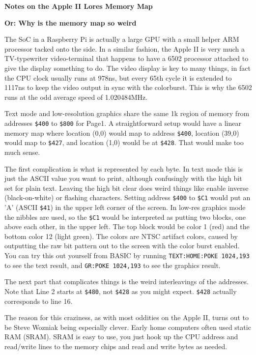 \documentclass{article}
\begin{document}
\begin{center}
\begin{large}
{\bf Notes on the Apple II Lores Memory Map}
\end{large}

{\bf Or: Why is the memory map so weird}
\end{center}
The SoC in a Raspberry Pi is actually a large GPU with a small
helper ARM processor tacked onto the side.
In a similar fashion, the Apple II is very much
a TV-typewriter video-terminal that happens to have a 6502
processor attached to give the display something to do.
The video display is key to many things, in fact the CPU clock
usually runs at 978ns, but every 65th cycle
it is extended to 1117ns to keep the video output in sync with the colorburst.
This is why the 6502 runs at the odd average speed of 1.020484MHz.

Text mode and low-resolution graphics share the same 1k region of memory
from addresses {\tt \$400} to  {\tt \$800} for Page1.
A straightforward setup would have a linear memory map where
location (0,0) would map to address {\tt \$400}, location (39,0) would map
to {\tt \$427}, and location (1,0) would be at {\tt \$428}.
That would make too much sense.

The first complication is what is represented by each byte.
In text mode this is just the ASCII value you want to print,
although confusingly with the high bit set for plain text.
Leaving the high bit clear does weird things like enable inverse 
(black-on-white) or flashing characters.
Setting address {\tt \$400} to {\tt \$C1}
would put an 'A' (ASCII {\tt \$41})
in the upper left corner of the screen.
In low-res graphics mode the nibbles are used, so the {\tt \$C1} would
be interpreted as putting two blocks, one above each other, in the upper
left.
The top block would be color 1 (red) and the bottom color 12 (light green).
The colors are NTSC artifact colors, caused by outputting the raw bit
pattern out to the screen with the color burst enabled.
You can try this out yourself from BASIC by running 
{\tt TEXT:HOME:POKE 1024,193} to see the text result, and
{\tt GR:POKE 1024,193} to see the graphics result.

The next part that complicates things is the weird interleavings of
the addresses.
Note that Line 2 starts at {\tt \$480}, not {\tt \$428} as you might expect.
{\tt \$428} actually corresponds to line 16.

The reason for this craziness, as with most oddities on the Apple II,
turns out to be Steve Wozniak being especially clever.
Early home computers often used static RAM (SRAM).
SRAM is easy to use, you just hook up the CPU address and read/write lines
to the memory chips and read and write bytes as needed.
\end{document}
